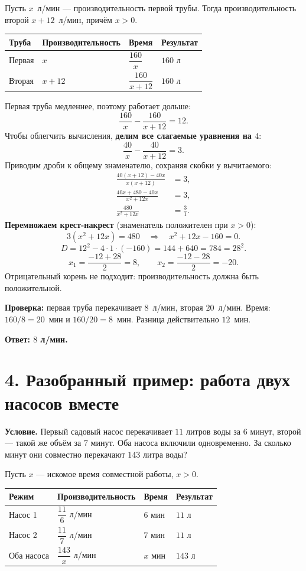 \documentclass[a4paper,12pt]{article}
\newcommand{\topic}[1]{\section*{\textcolor{darkaccent}{#1}}}
\newcommand{\linekey}[1]{\textcolor{darkaccent}{\textbf{#1}}}
\begin{document}
Пусть $x$~л/мин --- производительность первой трубы. Тогда производительность второй $x+12$~л/мин, причём $x>0$.
\begin{center}
\begin{tabularx}{\linewidth}{@{}lXXX@{}}
\toprule
Труба & Производительность & Время & Результат \\
\midrule
Первая & $x$ & $\dfrac{160}{x}$ & $160$ л \\
Вторая & $x+12$ & $\dfrac{160}{x+12}$ & $160$ л \\
\bottomrule
\end{tabularx}
\end{center}

Первая труба медленнее, поэтому работает дольше:
\[
\frac{160}{x}-\frac{160}{x+12}=12.
\]
Чтобы облегчить вычисления, \textbf{делим все слагаемые уравнения на $4$}:
\[
\frac{40}{x}-\frac{40}{x+12}=3.
\]
Приводим дроби к общему знаменателю, сохраняя скобки у вычитаемого:
\begin{align*}
\frac{40(x+12)-40x}{x(x+12)}&=3,\\
\frac{40x+480-40x}{x^2+12x}&=3,\\
\frac{480}{x^2+12x}&=\frac{3}{1}.
\end{align*}
\textbf{Перемножаем крест-накрест} (знаменатель положителен при $x>0$):
\[
3(x^2+12x)=480\quad\Longrightarrow\quad x^2+12x-160=0.
\]
\[
D=12^2-4\cdot1\cdot(-160)=144+640=784=28^2.
\]
\[
x_1=\frac{-12+28}{2}=8,\qquad x_2=\frac{-12-28}{2}=-20.
\]
Отрицательный корень не подходит: производительность должна быть положительной.

\linekey{Проверка:} первая труба перекачивает $8$~л/мин, вторая $20$~л/мин. Время: $160/8=20$~мин и $160/20=8$~мин. Разница действительно $12$~мин.

\linekey{Ответ: $8$ л/мин.}

\clearpage
\topic{4. Разобранный пример: работа двух насосов вместе}
\textbf{Условие.} Первый садовый насос перекачивает $11$ литров воды за $6$ минут, второй --- такой же объём за $7$ минут. Оба насоса включили одновременно. За сколько минут они совместно перекачают $143$ литра воды?

Пусть $x$ --- искомое время совместной работы, $x>0$.
\begin{center}
\begin{tabularx}{\linewidth}{@{}lXXX@{}}
\toprule
Режим & Производительность & Время & Результат \\
\midrule
Насос 1 & $\dfrac{11}{6}$ л/мин & $6$ мин & $11$ л \\
Насос 2 & $\dfrac{11}{7}$ л/мин & $7$ мин & $11$ л \\
Оба насоса & $\dfrac{143}{x}$ л/мин & $x$ мин & $143$ л \\
\bottomrule
\end{tabularx}
\end{center}
\end{document}
